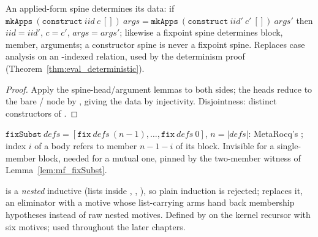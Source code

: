 \begin{lemma}
\label{lem:LBTerm-mkApps_construct_inj}
\leanok
{}
 An applied-form spine determines its data: if $\mathtt{mkApps}\ (\mathtt{construct}\ iid\ c\ [])\ args = \mathtt{mkApps}\ (\mathtt{construct}\ iid'\ c'\ [])\ args'$ then $iid=iid'$, $c=c'$, $args=args'$; likewise a fixpoint spine determines block, member, arguments; a constructor spine is never a fixpoint spine.
 Replaces case analysis on an -indexed relation, used by the determinism proof (Theorem~\ref{thm:eval_deterministic}).
\end{lemma}
\begin{proof}
\leanok
{}
 Apply the spine-head/argument lemmas to both sides; the heads reduce to the bare / node by , giving the data by injectivity. Disjointness: distinct constructors of .
\end{proof}

\begin{definition}
\label{def:LBTerm-fixSubst}
\leanok
{}
 $\mathtt{fixSubst}\ defs = [\mathtt{fix}\ defs\ (n-1),\dots,\mathtt{fix}\ defs\ 0]$, $n=|defs|$: MetaRocq's ; index $i$ of a body refers to member $n-1-i$ of its block.
 Invisible for a single-member block, needed for a mutual one, pinned by the two-member witness of Lemma~\ref{lem:mf_fixSubst}.
\end{definition}

\begin{definition}
\label{def:LBTerm-recData}
\leanok
{}
  is a \emph{nested} inductive (lists inside , , ), so plain induction is rejected;  replaces it, an  eliminator with a  motive whose list-carrying arms hand back membership hypotheses instead of raw nested motives.
 Defined by  on the kernel recursor with six motives; used throughout the later chapters.
\end{definition}

